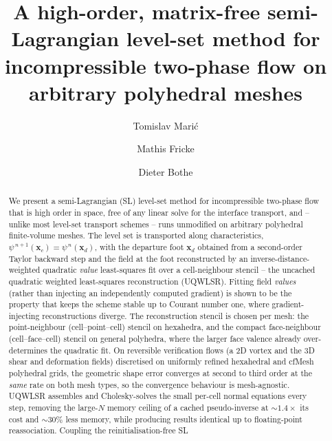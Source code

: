 \documentclass[preprint,3p,11pt]{elsarticle}
\newcommand{\psilev}{\psi}                       %
\newcommand{\xd}{\mathbf{x}_d}                    %
\newcommand{\xc}{\mathbf{x}_c}                    %
\begin{document}
\begin{frontmatter}

\title{A high-order, matrix-free semi-Lagrangian level-set method for
       incompressible two-phase flow on arbitrary polyhedral meshes}

\author[tud,fe]{Tomislav Mari\'c}

\author[tud,fe]{Mathis Fricke}

\author[tud]{Dieter Bothe}

\address[tud]{Mathematical Modeling and Analysis, Technische Universit\"at Darmstadt, Germany}
\address[fe]{Focused Energy, Darmstadt, Germany}

\begin{abstract}
We present a semi-Lagrangian (SL) level-set method for incompressible two-phase flow
that is high order in space, free of any linear solve for the interface transport, and
-- unlike most level-set transport schemes -- runs unmodified on arbitrary polyhedral
finite-volume meshes. The level set is transported along characteristics,
$\psilev^{\,n+1}(\xc)=\psilev^{\,n}(\xd)$, with the departure foot $\xd$ obtained from a
second-order Taylor backward step and the field at the foot reconstructed by an
inverse-distance-weighted quadratic \emph{value} least-squares fit over a cell-neighbour
stencil -- the uncached quadratic weighted least-squares reconstruction (UQWLSR).
Fitting field \emph{values} (rather than injecting an independently computed gradient)
is shown to be the property that keeps the scheme stable up to Courant number one, where
gradient-injecting reconstructions diverge. The reconstruction stencil is chosen per
mesh: the point-neighbour (cell--point--cell) stencil on hexahedra, and the compact
face-neighbour (cell--face--cell) stencil on general polyhedra, where the larger face
valence already over-determines the quadratic fit. On reversible verification flows
(a 2D vortex and the 3D shear and deformation fields) discretised on uniformly refined
hexahedral and cfMesh polyhedral grids, the geometric shape error converges at second to
third order at the \emph{same} rate on both mesh types, so the convergence behaviour is
mesh-agnostic. UQWLSR assembles and Cholesky-solves the small per-cell normal equations
every step, removing the large-$N$ memory ceiling of a cached pseudo-inverse at
$\sim\!1.4\times$ its cost and $\sim\!30\%$ less memory, while producing results
identical up to floating-point reassociation. Coupling the reinitialisation-free SL

\end{abstract}
\end{frontmatter}
\end{document}
